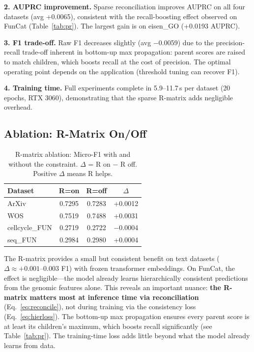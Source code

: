 \documentclass[11pt,a4paper]{article}
\begin{document}
\textbf{2. AUPRC improvement.} Sparse reconciliation improves AUPRC on
all four datasets (avg +0.0065), consistent with the recall-boosting
effect observed on FunCat (Table~\ref{tab:pr}).  The largest gain is
on eisen\_GO (+0.0193 AUPRC).

\textbf{3. F1 trade-off.} Raw F1 decreases slightly (avg $-$0.0059)
due to the precision-recall trade-off inherent in bottom-up max
propagation: parent scores are raised to match children, which boosts
recall at the cost of precision.  The optimal operating point depends
on the application (threshold tuning can recover F1).

\textbf{4. Training time.} Full experiments complete in 5.9--11.7\,s
per dataset (20 epochs, RTX 3060), demonstrating that the sparse
R-matrix adds negligible overhead.

\subsection{Ablation: R-Matrix On/Off}
\label{sec:ablation}

\begin{table}[h]
\centering
\caption{R-matrix ablation: Micro-F1 with and without the constraint.
$\Delta$ = R on $-$ R off. Positive $\Delta$ means R helps.}
\label{tab:ablation}
\begin{tabular}{lccc}
\toprule
\textbf{Dataset} & \textbf{R=on} & \textbf{R=off} & $\Delta$ \\
\midrule
ArXiv   & 0.7295 & 0.7283 & +0.0012 \\
WOS     & 0.7519 & 0.7488 & +0.0031 \\
cellcycle\_FUN & 0.2719 & 0.2722 & $-$0.0004 \\
seq\_FUN      & 0.2984 & 0.2980 & +0.0004 \\
\bottomrule
\end{tabular}
\end{table}

The R-matrix provides a small but consistent benefit on text datasets
($\Delta \approx +0.001$--$0.003$ F1) with frozen transformer
embeddings. On FunCat, the effect is negligible---the model already
learns hierarchically consistent predictions from the genomic features
alone. This reveals an important nuance: \textbf{the R-matrix matters
most at inference time via reconciliation} (Eq.~\ref{eq:reconcile}),
not during training via the consistency loss
(Eq.~\ref{eq:hierloss}). The bottom-up max propagation ensures every
parent score is at least its children's maximum, which boosts recall
significantly (see Table~\ref{tab:pr}). The training-time loss adds
little beyond what the model already learns from data.
\end{document}
